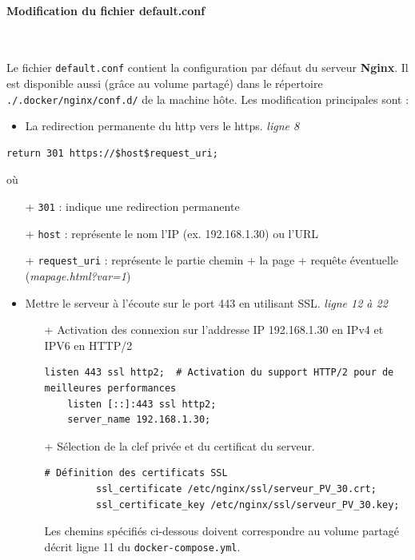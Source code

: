 \documentclass[french, 12pt]{article}%
\newcommand{\itemE}{\item[$\bullet$]}
\begin{document}
\paragraph{Modification du fichier default.conf} \ 

Le fichier \verb?default.conf? contient la configuration par défaut du serveur \textbf{Nginx}. Il est disponible aussi (grâce au volume partagé) dans le répertoire \verb?./.docker/nginx/conf.d/? de la machine hôte.  Les modification principales sont : 

\begin{itemize}
\itemE La redirection permanente du http vers le https. \textit{ligne 8}
\end{itemize}

\begin{lstlisting}[style=commande]
    return 301 https://$host$request_uri;
\end{lstlisting}
où 
\begin{itemize}
\item[+] \verb?301? : indique une redirection permanente
\item[+] \verb?host? : représente le nom l'IP  (ex. 192.168.1.30) ou l'URL
\item[+]  \verb?request_uri? : représente le partie chemin + la page + requête éventuelle (\textit{mapage.html?var=1})
\end{itemize}

\begin{itemize}
\itemE Mettre le serveur à l'écoute sur le port 443 en utilisant SSL. \textit{ligne 12 à 22}

	\begin{itemize}
	\item[+] Activation des connexion sur l'addresse IP 192.168.1.30 en IPv4 et IPV6 en HTTP/2 
	
	\begin{lstlisting}[style=commande]
	listen 443 ssl http2;  # Activation du support HTTP/2 pour de meilleures performances
	listen [::]:443 ssl http2;	
	server_name 192.168.1.30;
	\end{lstlisting}
	\end{itemize}

	\begin{itemize}
	\item[+] Sélection de la clef privée et du certificat du serveur. 
	
	\begin{lstlisting}[style=commande]
	    # Définition des certificats SSL                                                                                           
         ssl_certificate /etc/nginx/ssl/serveur_PV_30.crt;
         ssl_certificate_key /etc/nginx/ssl/serveur_PV_30.key;
	\end{lstlisting}
	Les chemins spécifiés ci-dessous doivent correspondre au volume partagé  décrit ligne 11 du \verb?docker-compose.yml?.
	\end{itemize}

\end{itemize}
\end{document}
